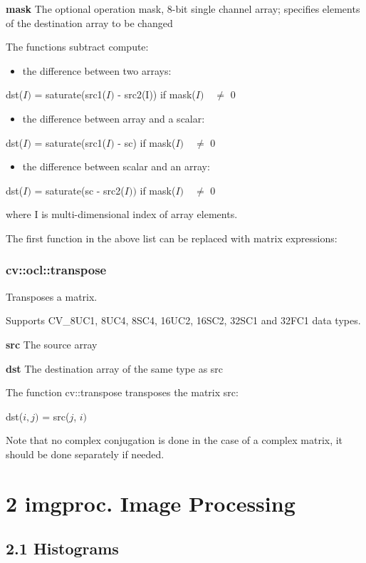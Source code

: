 \documentclass{article}
\begin{document}
\textbf{mask }The optional operation mask, 8-bit single channel array;
specifies elements of the destination array to be changed

The functions subtract compute:

\begin{itemize}
\item the difference between two arrays:
\end{itemize}
dst($I)$ = saturate(src1($I)$ - src2(I)) if mask($I) \quad \ne $ 0

\begin{itemize}
\item the difference between array and a scalar:
\end{itemize}
dst($I)$ = saturate(src1($I)$ - sc) if mask($I) \quad \ne $ 0

\begin{itemize}
\item the difference between scalar and an array:
\end{itemize}
dst($I)$ = saturate(sc - src2($I))$ if mask($I) \quad \ne $ 0

where I is multi-dimensional index of array elements.

The first function in the above list can be replaced with matrix
expressions:

\newpage

\subsubsection{cv::ocl::transpose}
\label{subsubsec:mylabel29}
Transposes a matrix.

Supports CV{\_}8UC1, 8UC4, 8SC4, 16UC2, 16SC2, 32SC1 and 32FC1 data types.

\textbf{src }The source array

\textbf{dst }The destination array of the same type as src

The function cv::transpose transposes the matrix src:

dst($i, j)$ = src($j$, $i)$

Note that no complex conjugation is done in the case of a complex matrix, it
should be done separately if needed.

\newpage

\section{2 imgproc. Image Processing}
\label{sec:mylabel2}
\subsection{2.1 Histograms}
\label{subsec:mylabel3}
\end{document}
